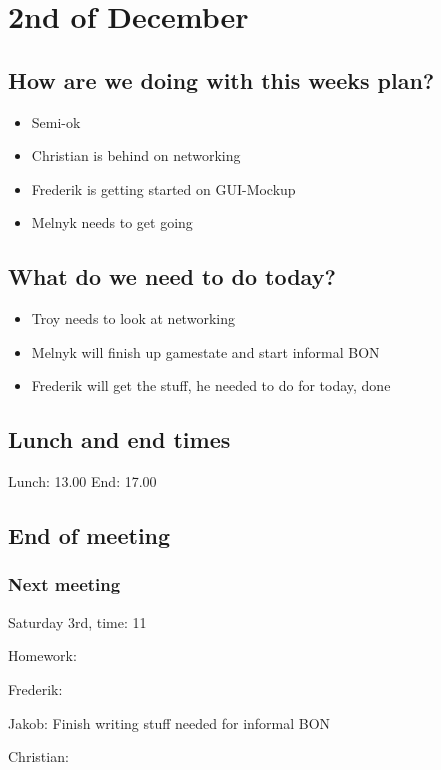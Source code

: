 \section{2nd of December}
\subsection{How are we doing with this weeks plan?}
\begin{itemize}
\item  Semi-ok
\item Christian is behind on networking
\item Frederik is getting started on GUI-Mockup
\item Melnyk needs to get going
\end{itemize}

\subsection{What do we need to do today?}
\begin{itemize}
\item Troy needs to look at networking
\item Melnyk will finish up gamestate and start informal BON
\item Frederik will get the stuff, he needed to do for today, done
\end{itemize}

\subsection{Lunch and end times}
Lunch:
13.00
End:
17.00
\subsection{End of meeting}
\subsubsection{Next meeting}
Saturday 3rd, time: 11

Homework:

Frederik:

Jakob: Finish writing stuff needed for informal BON

Christian:
